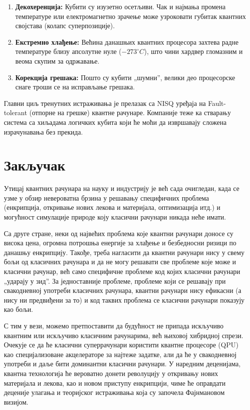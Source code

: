 \documentclass[12pt]{article}
\theoremstyle{plain}
\theoremstyle{definition}
\begin{document}
	\begin{enumerate}
		\item \textbf{Декохеренција:} Кубити су изузетно осетљиви. Чак и најмања промена температуре или електромагнетно зрачење може узроковати губитак квантних својстава (колапс суперпозиције).
		
		\item \textbf{Екстремно хлађење:} Већина данашњих квантних процесора захтева радне температуре близу апсолутне нуле ($-273^{\circ}C$), што чини хардвер гломазним и веома скупим за одржавање.
		
		\item \textbf{Корекција грешака:} Пошто су кубити „шумни”, велики део процесорске снаге троши се на исправљање грешака.
	\end{enumerate}
	
	
	Главни циљ тренутних истраживања је прелазак са NISQ уређаја на Fault-tolerant (отпорне на грешке) квантне рачунаре. Компаније теже ка стварању система са хиљадама логичких кубита који ће моћи да извршавају сложена израчунавања без прекида.
	
	\section{Закључак}
	Утицај квантних рачунара на науку и индустрију је већ сада очигледан, када се узме у обзир невероватна брзина у решавању специфичних проблема (енкрипција, откривање нових лекова и материјала, оптимизација итд.) и могућност симулације природе коју класични рачунари никада неће имати.
	
	Са друге стране, неки од највећих проблема које квантни рачунари доносе су висока цена, огромна потрошња енергије за хлађење и безбедносни ризици по данашњу енкрипцију. Такође, треба нагласити да квантни рачунари нису у свему бољи од класичних рачунара и да не могу решавати све проблеме које може и класични рачунар, већ само специфичне проблеме код којих класични рачунари „ударају у зид”. За једноставније проблеме, проблеме који се решавају при свакодневној употреби класичних рачунара, квантни рачунари нису ефикасни (а нису ни предвиђени за то) и код таквих проблема се класични рачунари показују као бољи.
	
	С тим у вези, можемо претпоставити да будућност не припада искључиво квантним или искључиво класичним рачунарима, већ њиховој хибридној спрези. Очекује се да ће класични суперрачунари користити квантне процесоре (QPU) као специјализоване акцелераторе за најтеже задатке, али да ће у свакодневној употреби и даље бити доминантни класични рачунари. У наредним деценијама, квантна технологија ће вероватно донети револуцију у откривању нових материјала и лекова, као и новом приступу енкрипцији, чиме ће оправдати деценије улагања и теоријског истраживања која су започела Фајнмановом визијом.
	
\end{document}
